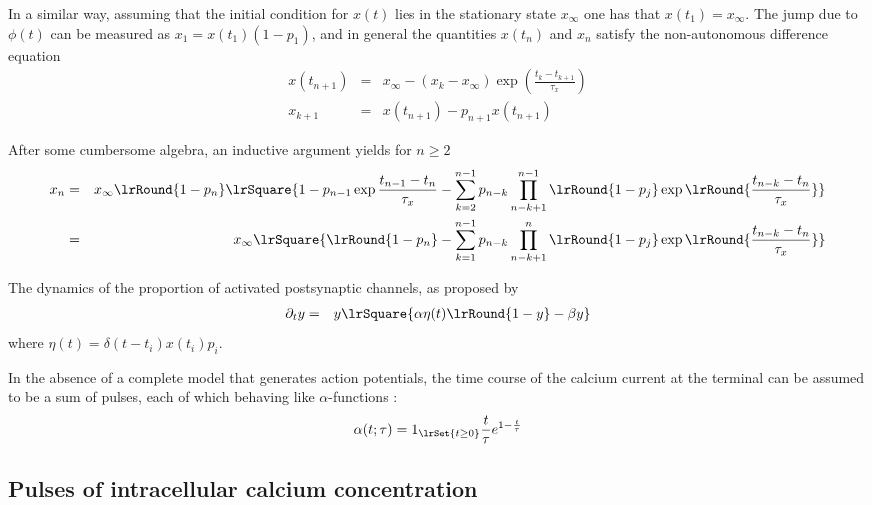 \documentclass[10pt]{article}
\begin{document}
In a similar way, assuming that the initial condition for $x(t)$ lies in the stationary state $x_{\infty}$ one has that $x(t_1)=x_{\infty}$. The jump due to $\phi(t)$ can be measured as $x_1=x(t_1)(1-p_1)$, and in general the quantities $x(t_n)$ and $x_n$ satisfy the non-autonomous difference equation
\begin{eqnarray*}
    x(t_{n+1}) & = & x_{\infty} - (x_k-x_{\infty})\exp{\left(\frac{t_k-t_{k+1}}{\tau_x}\right)}
    \\
    x_{k+1} & = & x(t_{n+1}) - p_{n+1}x(t_{n+1})
\end{eqnarray*}

After some cumbersome algebra, an inductive argument yields for $n\geq2$
\begin{eqnarray*}
x_{n} 
&=& x_{\infty} \lrRound{1-p_n}
\lrSquare{
1 - p_{n-1}\exp{\frac{t_{n-1}-t_{n}}{\tau_x}} 
- \sum_{k=2}^{n-1} p_{n-k} \prod_{n-k+1}^{n-1} \lrRound{1-p_j} \exp\lrRound{\frac{t_{n-k}-t_{n}}{\tau_x}}
}
\\
&=& x_{\infty} 
\lrSquare{
\lrRound{1-p_n} - \sum_{k=1}^{n-1} p_{n-k} 
\prod_{n-k+1}^{n} \lrRound{1-p_j} \exp\lrRound{\frac{t_{n-k}-t_{n}}{\tau_x}}
}
\end{eqnarray*}

The dynamics of the proportion of activated postsynaptic channels, as proposed by \cite{destexhe1998kinetic}
\begin{eqnarray*}
\partial_t y &=& y\lrSquare{\alpha \eta(t) \lrRound{1 -y} - \beta y} 
\end{eqnarray*}
where $\eta(t)= \delta(t-t_i) x(t_i) p_i$.



In the absence of a complete model that generates action potentials, the time course of the calcium current at the terminal can be assumed to be a sum of pulses, each of which behaving like $\alpha$-functions  \citep{}:
\begin{equation}
\alpha(t;\tau) = 1_{\lrSet{t\geq0}} \frac{t}{\tau} e^{1-\frac{t}{\tau}}
\end{equation}

\subsection{Pulses of intracellular calcium concentration}
\end{document}
